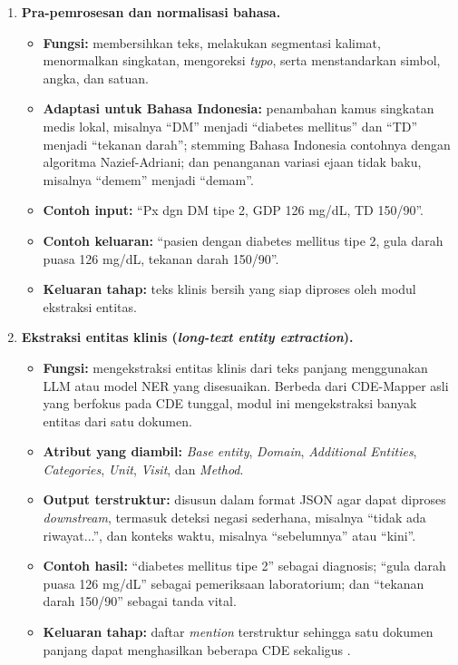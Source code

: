 \begin{enumerate}
    \item \textbf{Pra-pemrosesan dan normalisasi bahasa.}
    \begin{itemize}
        \item \textbf{Fungsi:} membersihkan teks, melakukan segmentasi kalimat, menormalkan singkatan, mengoreksi \textit{typo}, serta menstandarkan simbol, angka, dan satuan.
        \item \textbf{Adaptasi untuk Bahasa Indonesia:} penambahan kamus singkatan medis lokal, misalnya ``DM'' menjadi ``diabetes mellitus'' dan ``TD'' menjadi ``tekanan darah''; stemming Bahasa Indonesia contohnya dengan algoritma Nazief-Adriani; dan penanganan variasi ejaan tidak baku, misalnya ``demem'' menjadi ``demam''.
        \item \textbf{Contoh input:} ``Px dgn DM tipe 2, GDP 126 mg/dL, TD 150/90''.
        \item \textbf{Contoh keluaran:} ``pasien dengan diabetes mellitus tipe 2, gula darah puasa 126 mg/dL, tekanan darah 150/90''.
        \item \textbf{Keluaran tahap:} teks klinis bersih yang siap diproses oleh modul ekstraksi entitas.
    \end{itemize}

    \item \textbf{Ekstraksi entitas klinis (\textit{long-text entity extraction}).}
    \begin{itemize}
        \item \textbf{Fungsi:} mengekstraksi entitas klinis dari teks panjang menggunakan LLM atau model NER yang disesuaikan. Berbeda dari CDE-Mapper asli yang berfokus pada CDE tunggal, modul ini mengekstraksi banyak entitas dari satu dokumen.
        \item \textbf{Atribut yang diambil:} \textit{Base entity}, \textit{Domain}, \textit{Additional Entities}, \textit{Categories}, \textit{Unit}, \textit{Visit}, dan \textit{Method}.
        \item \textbf{Output terstruktur:} disusun dalam format JSON agar dapat diproses \textit{downstream}, termasuk deteksi negasi sederhana, misalnya ``tidak ada riwayat...'', dan konteks waktu, misalnya ``sebelumnya'' atau ``kini''.
        \item \textbf{Contoh hasil:} ``diabetes mellitus tipe 2'' sebagai diagnosis; ``gula darah puasa 126 mg/dL'' sebagai pemeriksaan laboratorium; dan ``tekanan darah 150/90'' sebagai tanda vital.
        \item \textbf{Keluaran tahap:} daftar \textit{mention} terstruktur sehingga satu dokumen panjang dapat menghasilkan beberapa CDE sekaligus \citep{purwitasari_comparison_2023}.
    \end{itemize}


\end{enumerate}
